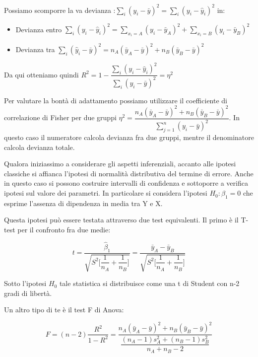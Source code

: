 \documentclass[a4paper]{extarticle}
\begin{document}
Possiamo scomporre la va devianza :$\sum\limits_i(y_i - \bar y)^2 = \sum\limits_i(y_i - \hat y_i)^2$ in:
\begin{itemize}
\item Devianza entro $ \sum\limits_{i} (y_i - \hat y_i)^2 = \sum\limits_{x_i = A} (y_i - \bar y_A)^2 + \sum\limits_{x_i=B} ( y_i - \bar y_B)^2 $
\item Devianza tra $\sum\limits_i(\hat y_i - \bar y)^2 = n_A ( \bar y_A - \bar y)^2 + n_B(\bar y_B - \bar y)^2$
\end{itemize} 

Da qui otteniamo quindi $R^2 = 1 - \dfrac{\sum\limits_i (y_i - \hat y_i)^2}{\sum\limits_i (y_i - \bar y)^2} = \eta^2$

Per valutare la bontà di adattamento possiamo utilizzare il coefficiente di correlazione di Fisher per due gruppi $\eta^2 = \dfrac{n_A ( \bar y_A - \bar y)^2 + n_B ( \bar y_B - \bar y)^2}{\sum\limits_{j=1}^n(y_i- \bar y)^2}$. In questo caso il numeratore calcola devianza fra due gruppi, mentre il denominatore calcola devianza totale.

Qualora iniziassimo a considerare gli aspetti inferenziali, accanto alle ipotesi classiche si affianca l'ipotesi di normalità distributiva del termine di errore. Anche in questo caso si possono costruire intervalli di confidenza e sottoporre a verifica ipotesi sul valore dei parametri. In particolare si considera l'ipotesi $H_0: \beta_1 =0$ che esprime l'assenza di dipendenza in media tra Y e X.

Questa ipotesi può essere testata attraverso due test equivalenti. Il primo è il T-test per il confronto fra due medie:

\begin{equation*}
t = \dfrac{\hat \beta_1}{\sqrt{S^2 \Biggr [  \dfrac{1}{n_A} + \dfrac{1}{n_B}  \Biggl ]}} =  \dfrac{\bar y_A - \bar y_B}{\sqrt{S^2 \Biggr [  \dfrac{1}{n_A} + \dfrac{1}{n_B}  \Biggl ]}} 
\end{equation*}

Sotto l'ipotesi $H_0$ tale statistica si distribuisce come una t di Student con n-2 gradi di libertà.

Un altro tipo di te è il test F di Anova:

\begin{equation*}
F = (n-2) \dfrac{R^2}{1-R^2} = \dfrac{n_A (\bar y_A - \bar y)^2 + n_B (\bar y_B - \bar y)^2}{\dfrac{(n_A - 1)s_A^2 + (n_B - 1)s_B^2}{n_A +n_B - 2}}
\end{equation*}
\end{document}
